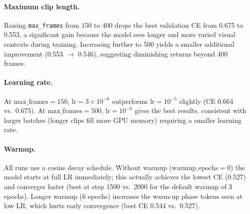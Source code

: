 \documentclass{article}
\begin{document}
\paragraph{Maximum clip length.}
Raising \texttt{max\_frames} from 150 to 400 drops the best validation CE
from 0.675 to 0.553, a significant gain because the model sees longer and
more varied visual contexts during training.
Increasing further to 500 yields a smaller additional improvement
(0.553 $\to$ 0.546), suggesting diminishing returns beyond 400 frames.

\paragraph{Learning rate.}
At $\text{max\_frames}=150$, $\text{lr}=3\times10^{-6}$ outperforms
$\text{lr}=10^{-5}$ slightly (CE 0.664 vs.\ 0.675).
At $\text{max\_frames}=500$, $\text{lr}=10^{-6}$ gives the best results,
consistent with larger batches (longer clips fill more GPU memory) requiring
a smaller learning rate.

\paragraph{Warmup.}
All runs use a cosine decay schedule.
Without warmup ($\text{warmup\_epochs}=0$) the model starts at full LR
immediately; this actually achieves the lowest CE (0.527) and converges
faster (best at step 1500 vs.\ 2000 for the default warmup of 3 epochs).
Longer warmup (6 epochs) increases the warm-up phase tokens seen at low LR,
which hurts early convergence (best CE 0.544 vs.\ 0.527).
\end{document}
